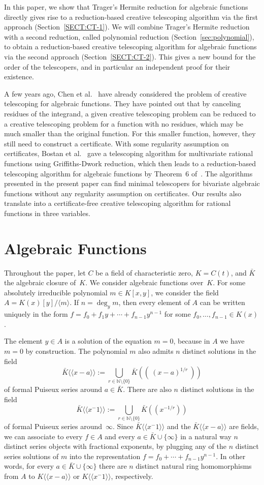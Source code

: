 \documentclass{sig-alternate}
\def\<#1>{\langle\!\langle#1\rangle\!\rangle} %
\let\set\mathbb
\begin{document}
In this paper, we show that Trager's Hermite reduction for algebraic
functions directly gives rise to a reduction-based creative telescoping
algorithm via the first approach (Section~\ref{SECT:CT-1}). We will combine Trager's Hermite reduction
with a second reduction, called polynomial reduction (Section~\ref{sec:polynomial}), to obtain a reduction-based creative
telescoping algorithm for algebraic functions via the second approach (Section~\ref{SECT:CT-2}).
This gives a new bound for the order of the telescopers, and in
particular an independent proof for their existence.

A few years ago, Chen et al.~\cite{chen12d} have already considered the problem of creative
telescoping for algebraic functions. They have pointed out that by canceling residues
of the integrand, a given creative telescoping problem can be reduced to a creative
telescoping problem for a function with no residues, which may be much smaller than the
original function. For this smaller function, however, they still need to construct a
certificate. With some regularity assumption on certificates, Bostan et al.~\cite{bostan13}
gave a telescoping algorithm for multivariate rational functions using Griffiths-Dwork reduction,
which then leads to a reduction-based telescoping algorithm for algebraic functions by Theorem~6 of~\cite{chen12d}.
The algorithms presented in the present paper can find minimal
telescopers for bivariate algebraic functions without any regularity assumption on certificates.
Our results also translate into a certificate-free
creative telescoping algorithm for rational functions in three variables.

\section{Algebraic Functions}

Throughout the paper, let $C$ be a field of characteristic zero, $K=C(t)$, and $\bar K$ the algebraic closure of~$K$.
We consider algebraic functions over~$K$.  For some absolutely irreducible
polynomial $m\in K[x,y]$, we consider the field
$A=K(x)[y]/\langle m\rangle$. If $n=\deg_ym$, then every element of $A$ can be written uniquely in the form
$f=f_0+f_1y+\cdots+f_{n-1}y^{n-1}$ for some $f_0,\dots,f_{n-1}\in K(x)$.

The element $y\in A$ is a solution of the equation $m=0$,
because in $A$ we have $m=0$ by construction. The polynomial $m$ also admits
$n$ distinct solutions in the field
\[
  \bar K\<x-a>:=\bigcup_{r\in\set N\setminus\{0\}} \bar K(\!(\ (x-a)^{1/r}\ )\!)
\]
of formal Puiseux series around $a\in\bar K$. There are also $n$ distinct
solutions in the field
\[
  \bar K\<x^{-1}>:=\bigcup_{r\in\set N\setminus\{0\}} \bar K(\!(x^{-1/r})\!)
\]
of formal Puiseux series around~$\infty$.
Since $\bar K\<x^{-1}>$ and the $\bar K\<x-a>$ are fields, we can associate to every
$f\in A$ and every $a\in\bar K\cup\{\infty\}$ in a natural way $n$ distinct series
objects with fractional exponents, by plugging any of the $n$ distinct series solutions
of $m$ into the representation $f=f_0+\cdots+f_{n-1}y^{n-1}$.
In other words, for every $a\in\bar K\cup\{\infty\}$ there are $n$ distinct natural
ring homomorphisms from $A$ to $K\<x-a>$ or $K\<x^{-1}>$, respectively.
\end{document}
